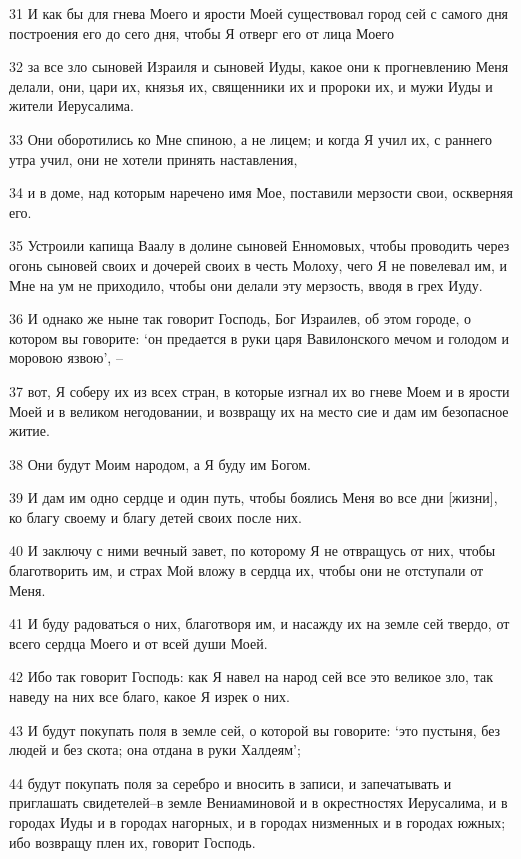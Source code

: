\par 31 И как бы для гнева Моего и ярости Моей существовал город сей с самого дня построения его до сего дня, чтобы Я отверг его от лица Моего
\par 32 за все зло сыновей Израиля и сыновей Иуды, какое они к прогневлению Меня делали, они, цари их, князья их, священники их и пророки их, и мужи Иуды и жители Иерусалима.
\par 33 Они оборотились ко Мне спиною, а не лицем; и когда Я учил их, с раннего утра учил, они не хотели принять наставления,
\par 34 и в доме, над которым наречено имя Мое, поставили мерзости свои, оскверняя его.
\par 35 Устроили капища Ваалу в долине сыновей Енномовых, чтобы проводить через огонь сыновей своих и дочерей своих в честь Молоху, чего Я не повелевал им, и Мне на ум не приходило, чтобы они делали эту мерзость, вводя в грех Иуду.
\par 36 И однако же ныне так говорит Господь, Бог Израилев, об этом городе, о котором вы говорите: `он предается в руки царя Вавилонского мечом и голодом и моровою язвою', --
\par 37 вот, Я соберу их из всех стран, в которые изгнал их во гневе Моем и в ярости Моей и в великом негодовании, и возвращу их на место сие и дам им безопасное житие.
\par 38 Они будут Моим народом, а Я буду им Богом.
\par 39 И дам им одно сердце и один путь, чтобы боялись Меня во все дни [жизни], ко благу своему и благу детей своих после них.
\par 40 И заключу с ними вечный завет, по которому Я не отвращусь от них, чтобы благотворить им, и страх Мой вложу в сердца их, чтобы они не отступали от Меня.
\par 41 И буду радоваться о них, благотворя им, и насажду их на земле сей твердо, от всего сердца Моего и от всей души Моей.
\par 42 Ибо так говорит Господь: как Я навел на народ сей все это великое зло, так наведу на них все благо, какое Я изрек о них.
\par 43 И будут покупать поля в земле сей, о которой вы говорите: `это пустыня, без людей и без скота; она отдана в руки Халдеям';
\par 44 будут покупать поля за серебро и вносить в записи, и запечатывать и приглашать свидетелей--в земле Вениаминовой и в окрестностях Иерусалима, и в городах Иуды и в городах нагорных, и в городах низменных и в городах южных; ибо возвращу плен их, говорит Господь.

